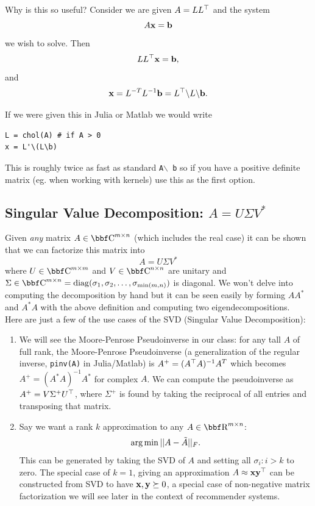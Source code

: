\documentclass{article}
\begin{document}
Why is this so useful? Consider we are given $A=LL^\top$ and the system
\[
    A{\bf x} = {\bf b}
\]
we wish to solve. Then
\[
    LL^\top{\bf x} = {\bf b},
\]
and
\[
    {\bf x} = L^{-T}L^{-1}{\bf b} = L^\top\backslash L \backslash {\bf b}.
\]

If we were given this in Julia or Matlab we would write
{
\par
\ttfamily\small
\begin{verbatim}
L = chol(A) # if A > 0
x = L'\(L\b)
\end{verbatim}
\par
}
This is roughly twice as fast as standard \texttt{A$\backslash$ b}
so if you have a positive definite matrix (eg. when working with
kernels) use this as the first option.

\subsection{Singular Value Decomposition: $A = U\Sigma V^*$}

Given \textit{any} matrix $A\in\CC^{m\times n}$ (which includes the real
case) it can be shown that we can factorize this matrix into
\[
    A = U\Sigma V^*
\]
where $U\in\CC^{m\times m}$ and $V\in\CC^{n\times n}$ are unitary and
$\Sigma\in\CC^{m\times n} = \mathrm{diag}(\sigma_1, \sigma_2,\dots,
\sigma_{\min(m,n)})$ is diagonal. We won't delve into computing the
decomposition by hand but it can be seen easily by forming $AA^*$ and
$A^*A$ with the above definition and computing two eigendecompositions.\\

Here are just a few of the use cases of the SVD (Singular Value Decomposition):
\begin{enumerate}
\item We will see the Moore-Penrose Pseudoinverse in our class: for any
    tall $A$ of full rank, the Moore-Penrose Pseudoinverse (a generalization
    of the regular inverse, \texttt{pinv(A)} in Julia/Matlab) is
    $A^+ = (A^\top A)^{-1}A^T$ which becomes $A^+ = (A^*A)^{-1}A^*$ for complex
    $A$. We can compute the pseudoinverse as $A^+ = V\Sigma^+ U^\top$, where
    $\Sigma^+$ is found by taking the reciprocal of all entries and transposing
    that matrix.
\item Say we want a rank $k$ approximation to any $A\in\RR^{m\times n}$:
    \[
        \operatorname*{arg\,min} || A - \tilde A ||_F.
    \]
    This can be generated by taking the SVD of $A$ and setting all
    $\sigma_i : i > k$ to zero. The special case of $k=1$, giving an
    approximation $A \approx {\bf x}{\bf y}^\top$ can be constructed from SVD
    to have ${\bf x},{\bf y} \succeq 0$, a special case of non-negative matrix
    factorization we will see later in the context of recommender systems.
\end{enumerate}
\end{document}
